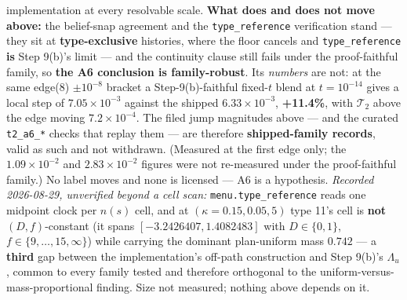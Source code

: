 \documentclass[11pt,a4paper]{article}
\newcommand{\Tmap}{\mathcal{T}}
\begin{document}
\begin{description}[leftmargin=1.9em,style=unboxed]
{  implementation at every resolvable scale.} \textbf{What does and does not move above:} the
  belief-snap agreement and the \texttt{type\_reference} verification stand --- they sit at
  \textbf{type-exclusive} histories, where the floor cancels and \texttt{type\_reference}
  \textbf{is} Step 9(b)'s limit --- and the continuity clause still fails under the
  proof-faithful family, so \textbf{the A6 conclusion is family-robust}. Its
  \emph{numbers} are not: at the same edge(8) $\pm10^{-8}$ bracket a Step-9(b)-faithful
  fixed-$t$ blend at $t=10^{-14}$ gives a local step of $7.05\times10^{-3}$ against the
  shipped $6.33\times10^{-3}$, \textbf{+11.4\%}, with $\Tmap_2$ above the edge moving
  $7.2\times10^{-4}$. The filed jump magnitudes above --- and the curated
  \texttt{t2\_a6\_*} checks that replay them --- are therefore \textbf{shipped-family
  records}, valid as such and not withdrawn. (Measured at the first edge only; the
  $1.09\times10^{-2}$ and $2.83\times10^{-2}$ figures were not re-measured under the
  proof-faithful family.) No label moves and none is licensed --- A6 is a hypothesis.
  \emph{Recorded 2026-08-29, unverified beyond a cell scan:} \texttt{menu.type\_reference}
  reads one midpoint clock per $n(s)$ cell, and at $(\kappa{=}0.15, 0.05, 5)$ type 11's cell
  is \textbf{not} $(D,f)$-constant (it spans $[-3.2426407, 1.4082483]$ with
  $D\in\{0,1\}$, $f\in\{9,\dots,15, \infty\}$) while carrying the dominant plan-uniform mass
  $0.742$ --- a \textbf{third} gap between the implementation's off-path construction and
  Step 9(b)'s $\Lambda_u$, common to every family tested and therefore orthogonal to the
  uniform-versus-mass-proportional finding. Size not measured; nothing above depends on it.


\end{description}
\end{document}
